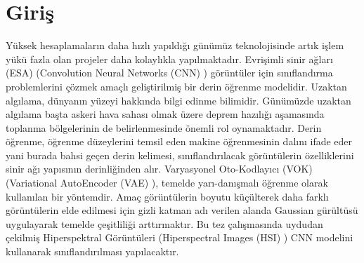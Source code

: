 \chapter{Giriş}
Yüksek hesaplamaların daha hızlı yapıldığı günümüz teknolojisinde artık işlem yükü fazla olan projeler daha kolaylıkla yapılmaktadır. Evrişimli sinir ağları (ESA) (Convolution Neural Networks (CNN) ) görüntüler için sınıflandırma problemlerini çözmek amaçlı geliştirilmiş bir derin öğrenme modelidir. Uzaktan algılama, dünyanın yüzeyi hakkında bilgi edinme bilimidir. Günümüzde uzaktan algılama başta askeri hava sahası olmak üzere deprem hazılığı aşamasında toplanma bölgelerinin de belirlenmesinde önemli rol oynamaktadır. Derin öğrenme, öğrenme düzeylerini temsil eden makine öğrenmesinin dalını ifade eder yani burada bahsi geçen derin kelimesi, sınıflandırılacak görüntülerin özelliklerini sinir ağı yapısının derinliğinden alır. Varyasyonel Oto-Kodlayıcı (VOK) (Variational AutoEncoder (VAE) ), temelde yarı-danışmalı öğrenme olarak kullanılan bir yöntemdir. Amaç görüntülerin boyutu küçülterek daha farklı görüntülerin elde edilmesi için gizli katman adı verilen alanda Gaussian gürültüsü uygulayarak temelde çeşitliliği arttırmaktır. Bu tez çalışmasında uydudan çekilmiş Hiperspektral Görüntüleri (Hiperspectral Images (HSI) ) CNN modelini kullanarak sınıflandırılması yapılacaktır.



